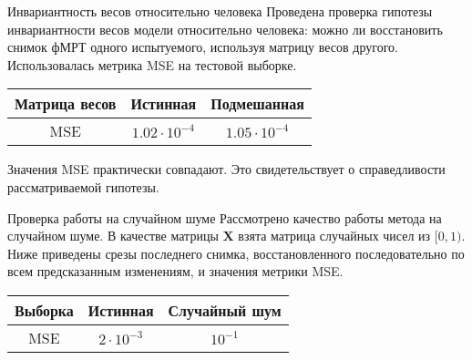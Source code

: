 \documentclass{beamer}
\begin{document}
\begin{frame}{Инвариантность весов относительно человека}
    Проведена проверка гипотезы инвариантности весов модели относительно человека:
	можно ли восстановить снимок фМРТ одного испытуемого, используя
	матрицу весов другого. Использовалась метрика MSE на тестовой выборке.
    \begin{table}[h!]
		\centering
		\begin{tabular}{|c|c|c|}
			\hline
			Матрица весов	&	Истинная	&	Подмешанная\footnotemark[1] \\ \hline \hline
			MSE		& 	$1.02 \cdot 10^{-4}$	 &		$1.05 \cdot 10^{-4}$ \\ \hline
		\end{tabular}
		\label{table:1}
	\end{table}
    Значения MSE практически совпадают. Это свидетельствует о справедливости рассматриваемой гипотезы. 
\end{frame}
\begin{frame}{Проверка работы на случайном шуме}
    Рассмотрено качество работы метода на случайном шуме. В качестве матрицы $\mathbf{X}$
	взята матрица случайных чисел из $[0, 1)$. Ниже приведены срезы последнего снимка, восстановленного
    последовательно по всем предсказанным изменениям, и значения метрики MSE.
	\begin{figure}[h!]
		\centering
		\hfill
		\hfill
		\label{fig:8}
	\end{figure}
    \begin{table}[h!]
		\centering
		\begin{tabular}{|c|c|c|}
			\hline
			Выборка	&	Истинная	&	Случайный шум \\ \hline \hline
			MSE		& 	$2 \cdot 10^{-3}$	 &		$10^{-1}$ \\ \hline
		\end{tabular}
		\label{table:2}
	\end{table}    
\end{frame}
\end{document}
